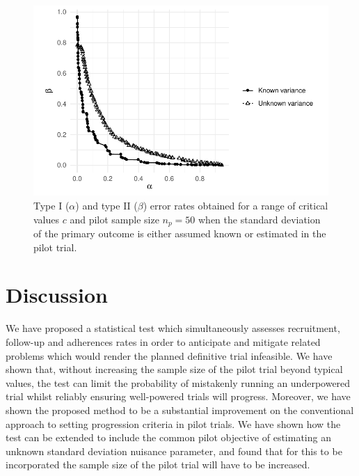 \documentclass[AMA,STIX1COL]{WileyNJD-v2}
\begin{document}
\begin{figure}
\centering
\includegraphics[scale=0.8]{./Figures/var_ocs.pdf}
\caption{Type I ($\alpha$) and type II ($\beta$) error rates obtained for a range of critical values $c$ and pilot sample size $n_p = 50$ when the standard deviation of the primary outcome is either assumed known or estimated in the pilot trial.}
\label{fig:unknown_var}
\end{figure}

\section{Discussion}\label{sec:discussion}

We have proposed a statistical test which simultaneously assesses recruitment, follow-up and adherences rates in order to anticipate and mitigate related problems which would render the planned definitive trial infeasible. We have shown that, without increasing the sample size of the pilot trial beyond typical values, the test can limit the probability of mistakenly running an underpowered trial whilst reliably ensuring well-powered trials will progress. Moreover, we have shown the proposed method to be a substantial improvement on the conventional approach to setting progression criteria in pilot trials. We have shown how the test can be extended to include the common pilot objective of estimating an unknown standard deviation nuisance parameter, and found that for this to be incorporated the sample size of the pilot trial will have to be increased.

\end{document}
